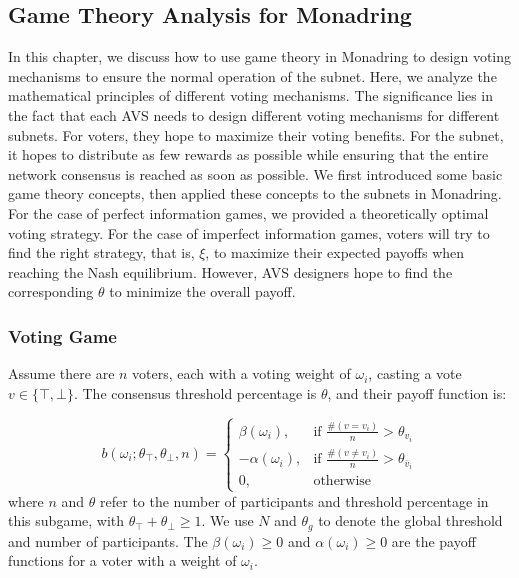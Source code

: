 \documentclass[11pt]{article}
\begin{document}
\subsection{Game Theory Analysis for Monadring}
In this chapter, we discuss how to use game theory in Monadring to design voting mechanisms to ensure the normal operation of the subnet. Here, we analyze the mathematical principles of different voting mechanisms. The significance lies in the fact that each AVS needs to design different voting mechanisms for different subnets. For voters, they hope to maximize their voting benefits. For the subnet, it hopes to distribute as few rewards as possible while ensuring that the entire network consensus is reached as soon as possible. We first introduced some basic game theory concepts, then applied these concepts to the subnets in Monadring. For the case of perfect information games, we provided a theoretically optimal voting strategy. For the case of imperfect information games, voters will try to find the right strategy, that is, $\xi$, to maximize their expected payoffs when reaching the Nash equilibrium. However, AVS designers hope to find the corresponding $\theta$ to minimize the overall payoff.
\subsubsection{Voting Game}
Assume there are $n$ voters, each with a voting weight of $\omega_i$, casting a vote $v\in{\{\top,\bot\}}$. The consensus threshold percentage is $\theta$, and their payoff function is:

\begin{equation}
b(\omega_i; \theta_\top,\theta_\bot, n) = 
\begin{cases}
\beta(\omega_i), & \text{if } \frac{\#(v = v_i)}{n} > \theta_{v_i} \\
-\alpha(\omega_i), & \text{if } \frac{\#(v \neq v_i)}{n} > \theta_{\bar{v}_i} \\
0, & \text{otherwise}
\end{cases}
\end{equation}
where $n$ and $\theta$ refer to the number of participants and threshold percentage in this subgame, with $\theta_\top+\theta_\bot\geq 1$. We use $N$ and $\theta_g$ to denote the global threshold and number of participants. The $\beta(\omega_i)\geq 0$ and $\alpha(\omega_i)\geq 0$ are the payoff functions for a voter with a weight of $\omega_i$.
\end{document}
